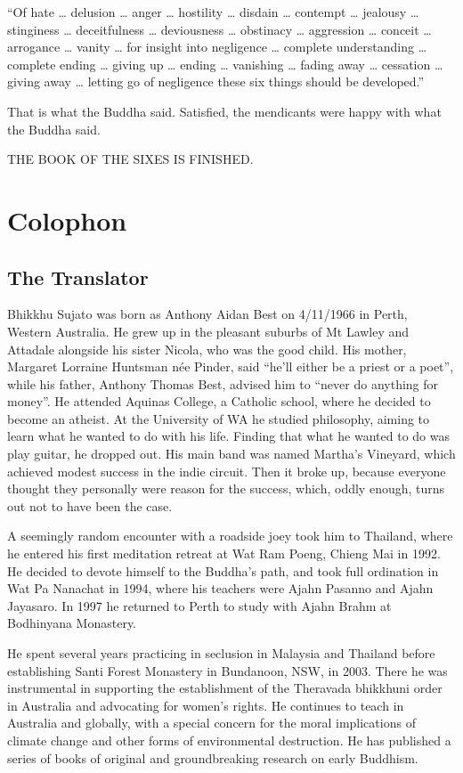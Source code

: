\documentclass[12pt,openany]{book}%
\newcommand*{\scendbook}[1]{\begin{center}\uppercase{#1}\end{center}}
\let\oldbackmatter\backmatter
\renewcommand{\backmatter}{%
\chapterfont{\setstretch{.85}\normalfont\centering}%
\sectionfont{\setstretch{.85}\Semiboldsubheadfont}%
\oldbackmatter}
\begin{document}
“Of hate … delusion … anger … hostility … disdain … contempt … jealousy … stinginess … deceitfulness … deviousness … obstinacy … aggression … conceit … arrogance … vanity … for insight into negligence … complete understanding … complete ending … giving up … ending … vanishing … fading away … cessation … giving away … letting go of negligence these six things should be developed.” 

That is what the Buddha said. Satisfied, the mendicants were happy with what the Buddha said. 

\scendbook{The Book of the Sixes is finished. }

%
\backmatter%
\chapter*{Colophon}

\section*{The Translator}

Bhikkhu Sujato was born as Anthony Aidan Best on 4/11/1966 in Perth, Western Australia. He grew up in the pleasant suburbs of Mt Lawley and Attadale alongside his sister Nicola, who was the good child. His mother, Margaret Lorraine Huntsman née Pinder, said “he’ll either be a priest or a poet”, while his father, Anthony Thomas Best, advised him to “never do anything for money”. He attended Aquinas College, a Catholic school, where he decided to become an atheist. At the University of WA he studied philosophy, aiming to learn what he wanted to do with his life. Finding that what he wanted to do was play guitar, he dropped out. His main band was named Martha’s Vineyard, which achieved modest success in the indie circuit. Then it broke up, because everyone thought they personally were reason for the success, which, oddly enough, turns out not to have been the case. 

A seemingly random encounter with a roadside joey took him to Thailand, where he entered his first meditation retreat at Wat Ram Poeng, Chieng Mai in 1992. He decided to devote himself to the Buddha’s path, and took full ordination in Wat Pa Nanachat in 1994, where his teachers were Ajahn Pasanno and Ajahn Jayasaro. In 1997 he returned to Perth to study with Ajahn Brahm at Bodhinyana Monastery. 

He spent several years practicing in seclusion in Malaysia and Thailand before establishing Santi Forest Monastery in Bundanoon, NSW, in 2003. There he was instrumental in supporting the establishment of the Theravada bhikkhuni order in Australia and advocating for women’s rights. He continues to teach in Australia and globally, with a special concern for the moral implications of climate change and other forms of environmental destruction. He has published a series of books of original and groundbreaking research on early Buddhism. 
\end{document}
